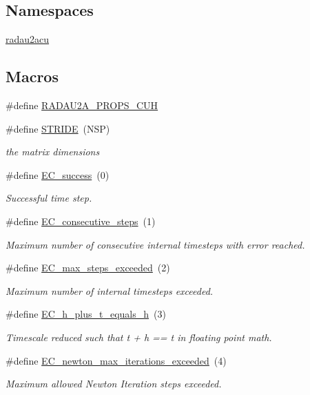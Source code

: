 \subsection*{Namespaces}
\begin{DoxyCompactItemize}
\item 
 \hyperlink{namespaceradau2acu}{radau2acu}
\end{DoxyCompactItemize}
\subsection*{Macros}
\begin{DoxyCompactItemize}
\item 
\#define \hyperlink{radau2a__props_8cuh_acb5834e026c7d7045b16acfcb25a5f7d}{R\+A\+D\+A\+U2\+A\+\_\+\+P\+R\+O\+P\+S\+\_\+\+C\+UH}
\item 
\#define \hyperlink{radau2a__props_8cuh_a351d54267048643c4365f6a24641d0cf}{S\+T\+R\+I\+DE}~(N\+SP)
\begin{DoxyCompactList}\small\item\em the matrix dimensions \end{DoxyCompactList}\item 
\#define \hyperlink{group__RKCU__ErrCodes_gabd83bc0f9f475a2189a4db4a08b790ca}{E\+C\+\_\+success}~(0)
\begin{DoxyCompactList}\small\item\em Successful time step. \end{DoxyCompactList}\item 
\#define \hyperlink{group__RKCU__ErrCodes_gae0287841c08f86f5709660fd731615ad}{E\+C\+\_\+consecutive\+\_\+steps}~(1)
\begin{DoxyCompactList}\small\item\em Maximum number of consecutive internal timesteps with error reached. \end{DoxyCompactList}\item 
\#define \hyperlink{group__RKCU__ErrCodes_ga0f0275d9851ab5c19b79a963d5084df3}{E\+C\+\_\+max\+\_\+steps\+\_\+exceeded}~(2)
\begin{DoxyCompactList}\small\item\em Maximum number of internal timesteps exceeded. \end{DoxyCompactList}\item 
\#define \hyperlink{group__RKCU__ErrCodes_ga9326efd544880e2683c4453365ca2704}{E\+C\+\_\+h\+\_\+plus\+\_\+t\+\_\+equals\+\_\+h}~(3)
\begin{DoxyCompactList}\small\item\em Timescale reduced such that t + h == t in floating point math. \end{DoxyCompactList}\item 
\#define \hyperlink{group__RKCU__ErrCodes_gaae2906abd9ae8a2791c2e8626ca73a32}{E\+C\+\_\+newton\+\_\+max\+\_\+iterations\+\_\+exceeded}~(4)
\begin{DoxyCompactList}\small\item\em Maximum allowed Newton Iteration steps exceeded. \end{DoxyCompactList}\end{DoxyCompactItemize}


